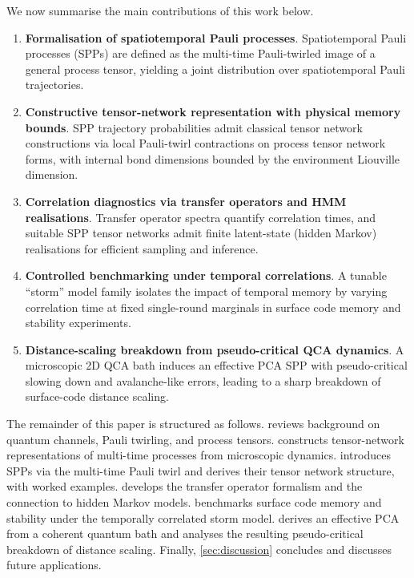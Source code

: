 We now summarise the main contributions of this work below.
\begin{enumerate}
    \item \textbf{Formalisation of spatiotemporal Pauli processes}. Spatiotemporal Pauli processes (SPPs) are defined as the multi-time Pauli-twirled image of a general process tensor, yielding a joint distribution over spatiotemporal Pauli trajectories.
    \item \textbf{Constructive tensor-network representation with physical memory bounds}. SPP trajectory probabilities admit classical tensor network constructions via local Pauli-twirl contractions on process tensor network forms, with internal bond dimensions bounded by the environment Liouville dimension.
    \item \textbf{Correlation diagnostics via transfer operators and HMM realisations}. Transfer operator spectra quantify correlation times, and suitable SPP tensor networks admit finite latent-state (hidden Markov) realisations for efficient sampling and inference.
    \item \textbf{Controlled benchmarking under temporal correlations}. A tunable ``storm'' model family isolates the impact of temporal memory by varying correlation time at fixed single-round marginals in surface code memory and stability experiments.
    \item \textbf{Distance-scaling breakdown from pseudo-critical QCA dynamics}. A microscopic 2D QCA bath induces an effective PCA SPP with pseudo-critical slowing down and avalanche-like errors, leading to a sharp breakdown of surface-code distance scaling.
\end{enumerate}

The remainder of this paper is structured as follows.  reviews background on quantum channels, Pauli twirling, and process tensors.  constructs tensor-network representations of multi-time processes from microscopic dynamics.  introduces SPPs via the multi-time Pauli twirl and derives their tensor network structure, with worked examples.  develops the transfer operator formalism and the connection to hidden Markov models.  benchmarks surface code memory and stability under the temporally correlated storm model.  derives an effective PCA from a coherent quantum bath and analyses the resulting pseudo-critical breakdown of distance scaling.
Finally, \cref{sec:discussion} concludes and discusses future applications.

